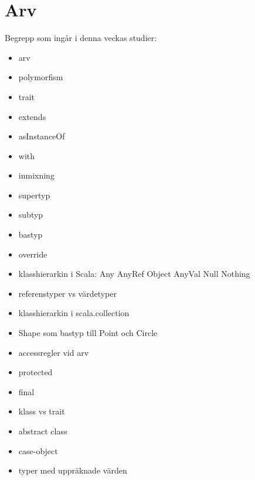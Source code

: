 \chapter{Arv}\label{chapter:W07}
Begrepp som ingår i denna veckas studier:
\begin{itemize}[noitemsep,label={$\square$},leftmargin=*]
\item arv
\item polymorfism
\item trait
\item extends
\item asInstanceOf
\item with
\item inmixning
\item supertyp
\item subtyp
\item bastyp
\item override
\item klasshierarkin i Scala: Any AnyRef Object AnyVal Null Nothing
\item referenstyper vs värdetyper
\item klasshierarkin i scala.collection
\item Shape som bastyp till Point och Circle
\item accessregler vid arv
\item protected
\item final
\item klass vs trait
\item abstract class
\item case-object
\item typer med uppräknade värden\end{itemize}

